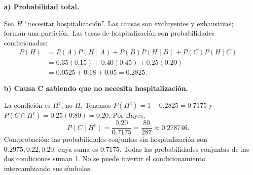 \textbf{a) Probabilidad total.}\par\nopagebreak[4]
Sea $H$ ``necesitar hospitalización''. Las causas son excluyentes y exhaustivas; forman una partición. Las tasas de hospitalización son probabilidades condicionadas:
\[
\begin{aligned}
P(H)&=P(A)P(H\mid A)+P(B)P(H\mid B)+P(C)P(H\mid C)\\
&=0.35(0.15)+0.40(0.45)+0.25(0.20)\\
&=0.0525+0.18+0.05=\boxed{0.2825}.
\end{aligned}
\]

\textbf{b) Causa C sabiendo que no necesita hospitalización.}\par\nopagebreak[4]
La condición es $H^c$, no $H$. Tenemos $P(H^c)=1-0.2825=0.7175$ y $P(C\cap H^c)=0.25(0.80)=0.20$. Por Bayes,
\[
P(C\mid H^c)=\frac{0.20}{0.7175}
=\boxed{\frac{80}{287}\approx0.278746}.
\]
Comprobación: las probabilidades conjuntas sin hospitalización son $0.2975,0.22,0.20$, cuya suma es 0.7175. Todas las probabilidades conjuntas de las dos condiciones suman 1. No se puede invertir el condicionamiento intercambiando sus símbolos.
